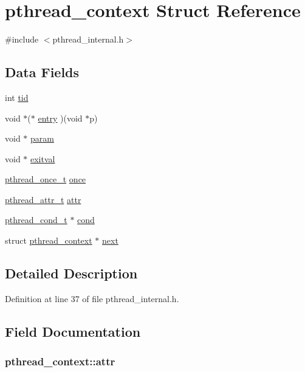 \hypertarget{structpthread__context}{\section{pthread\+\_\+context Struct Reference}
\label{structpthread__context}
}


{\ttfamily \#include $<$pthread\+\_\+internal.\+h$>$}

\subsection*{Data Fields}
\begin{DoxyCompactItemize}
\item 
int \hyperlink{structpthread__context_a5b7aa396dbf3c140b1a54f09568c8253}{tid}
\item 
void $\ast$($\ast$ \hyperlink{structpthread__context_a688eabe4cd81d34bed6c73abd442f54a}{entry} )(void $\ast$p)
\item 
void $\ast$ \hyperlink{structpthread__context_afb0244aa84b0403cc0df2cd6ebdb94b4}{param}
\item 
void $\ast$ \hyperlink{structpthread__context_ab2848ec5b075681f217e57545f986c1b}{exitval}
\item 
\hyperlink{pthread_8h_a18773caa8d79a98514e4291b855c3d80}{pthread\+\_\+once\+\_\+t} \hyperlink{structpthread__context_a33f7f059b1d0cda2a8675d13600b6dd2}{once}
\item 
\hyperlink{pthread_8h_ae242a79436919ba1cd46e38598bc17e7}{pthread\+\_\+attr\+\_\+t} \hyperlink{structpthread__context_a63e797747884670222fc0ea6fdf801fd}{attr}
\item 
\hyperlink{pthread_8h_a3fca5856f6b33b80711e4942c1e33a61}{pthread\+\_\+cond\+\_\+t} $\ast$ \hyperlink{structpthread__context_ace03687a8a5dc35db9e23fdc96bf0667}{cond}
\item 
struct \hyperlink{structpthread__context}{pthread\+\_\+context} $\ast$ \hyperlink{structpthread__context_a876fe0d5cfa5b9886c90e5936b98f992}{next}
\end{DoxyCompactItemize}


\subsection{Detailed Description}


Definition at line 37 of file pthread\+\_\+internal.\+h.



\subsection{Field Documentation}
\hypertarget{structpthread__context_a63e797747884670222fc0ea6fdf801fd}{
\subsubsection[{attr}]{ pthread\+\_\+context\+::attr}}\label{structpthread__context_a63e797747884670222fc0ea6fdf801fd}


